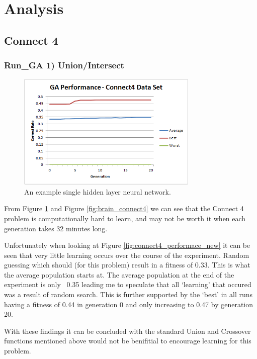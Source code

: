 \documentclass[journal]{IEEEtran}
\begin{document}
\section{Analysis}
  \subsection{Connect 4}
    \subsubsection*{Run_{GA} 1) Union/Intersect}
      \begin{figure}[here]%
        \centering
        \includegraphics[width=3.4in]{connect4_performance_new}
        \caption{An example single hidden layer neural network.}
        \label{fig:connect4_performance_new}
      \end{figure}
      From Figure \ref{fig:connect4_performance_new} and Figure \ref{fig:brain_connect4}
      we can see that the Connect 4 problem is computationally hard to learn, and may not
    be worth it when each generation takes 32 minutes long.

      Unfortunately when looking at Figure \ref{fig:connect4_performace_new} it can be seen
    that very little learning occurs over the course of the experiment. Random guessing
    which should (for this problem) result in a fitness of 0.33. This is what the average
    population starts at. The average population at the end of the experiment is only ~0.35
    leading me to speculate that all `learning' that occured was a result of random search.
    This is further supported by the `best' in all runs having a fitness of 0.44 in generation 0 and only
    increasing to 0.47 by generation 20.

    With these findings it can be concluded with the standard Union and Crossover functions
    mentioned above would not be benifitial to encourage learning for this problem.
\end{document}
